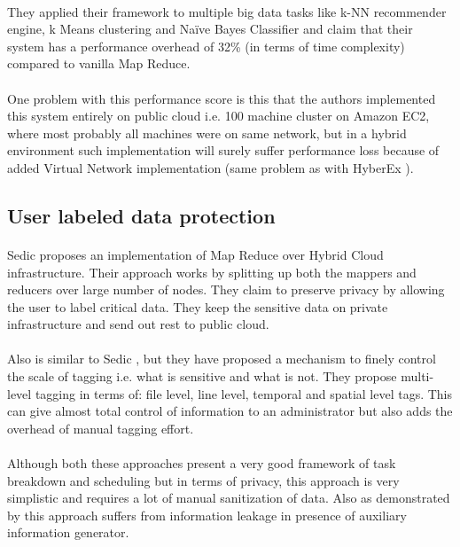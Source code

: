 \documentclass[12pt]{report}
\theoremstyle{named}
\begin{document}
\paragraph{}
They applied their framework to multiple big data tasks like k-NN recommender engine, k Means clustering and Naïve Bayes Classifier and claim that their system has a performance overhead of 32\% (in terms of time complexity) compared to vanilla Map Reduce.
\paragraph{}
One problem with this performance score is this that the authors implemented this system entirely on public cloud i.e. 100 machine cluster on Amazon EC2, where most probably all machines were on same network, but in a hybrid environment such implementation will surely suffer performance loss because of added Virtual Network implementation (same problem as with HyberEx \cite{ko2011hybrex}).
\subsection{User labeled data protection}
\paragraph{}
Sedic \cite{zhang2011sedic} proposes an implementation of Map Reduce over Hybrid Cloud infrastructure. Their approach works by splitting up both the mappers and reducers over large number of nodes. They claim to preserve privacy by allowing the user to label critical data. They keep the sensitive data on private infrastructure and send out rest to public cloud.
\paragraph{}
\cite{xu2015framework} Also is similar to Sedic \cite{zhang2011sedic}, but they have proposed a mechanism to finely control the scale of tagging i.e. what is sensitive and what is not. They propose multi-level tagging in terms of: file level, line level, temporal and spatial level tags. This can give almost total control of information to an administrator but also adds the overhead of manual tagging effort.
\paragraph{}
Although both these approaches present a very good framework of task breakdown and scheduling but in terms of privacy, this approach is very simplistic and requires a lot of manual sanitization of data. Also as demonstrated by \cite{dwork2004privacy} this approach suffers from information leakage in presence of auxiliary information generator.
\end{document}
